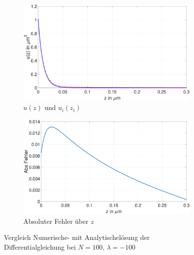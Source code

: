  \begin{figure}[h]
 	\begin{subfigure}[b]{0.5\textwidth}
 		\includegraphics[width=\textwidth]{figures/station_gl_2_1/test_n100_l100}
 		\caption{$u(z)$ und $u_{i}(z_i)$}
 	\end{subfigure}
 	\hfill
 	\begin{subfigure}[b]{0.5\textwidth}
 		\includegraphics[width=1\linewidth]{figures/station_gl_2_1/test_n100_l100_fehler}
 		\caption{Absoluter Fehler über $z$}
 	\end{subfigure}
 	\caption{Vergleich Numerische- mit Analytischelösung der Differentialgleichung bei $N=100,\,\lambda=-100$}
 \end{figure}
